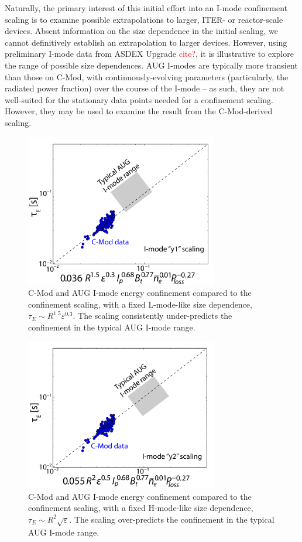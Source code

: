 \documentclass[12pt]{iopart}
\renewcommand{\note}[1]{\textcolor{red}{#1}}
\begin{document}
Naturally, the primary interest of this initial effort into an I-mode confinement scaling is to examine possible extrapolations to larger, ITER- or reactor-scale devices.
Absent information on the size dependence in the initial scaling, we cannot definitively establish an extrapolation to larger devices.
However, using preliminary I-mode data from ASDEX Upgrade \note{cite?}, it is illustrative to explore the range of possible size dependences.
AUG I-modes are typically more transient than those on C-Mod, with continuously-evolving parameters (particularly, the radiated power fraction) over the course of the I-mode -- as such, they are not well-suited for the stationary data points needed for a confinement scaling.
However, they may be used to examine the result from the C-Mod-derived scaling.

\begin{figure}[ht]
 \centering
 \includegraphics[width=0.75\textwidth]{tauE_Imode_fixed-L-like.pdf}
 \caption{C-Mod and AUG I-mode energy confinement compared to the confinement scaling, with a fixed L-mode-like size dependence, $\tau_E \sim R^{1.5} \varepsilon^{0.3}$.  The scaling consistently under-predicts the confinement in the typical AUG I-mode range.}
 \label{fig:Llike}
\end{figure}

\begin{figure}[ht]
 \centering
 \includegraphics[width=0.75\textwidth]{tauE_Imode_fixed-H-like.pdf}
 \caption{C-Mod and AUG I-mode energy confinement compared to the confinement scaling, with a fixed H-mode-like size dependence, $\tau_E \sim R^2 \sqrt{\varepsilon}$.  The scaling over-predicts the confinement in the typical AUG I-mode range.}
 \label{fig:Hlike}
\end{figure}
\end{document}
